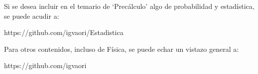 \vspace{5mm} Si se desea incluir en el temario de `Precálculo' algo de probabilidad y estadística, se puede acudir a:

\begin{Large}
\hspace{2cm} \textcolor{NavyBlue}{https://github.com/igvaori/Estadistica}
\end{Large}

\vspace{5mm} Para otros contenidos, incluso de Física, se puede echar un vistazo general a:

\begin{Large}
\hspace{2cm}\textcolor{NavyBlue}{https://github.com/igvaori}	
\end{Large}



















